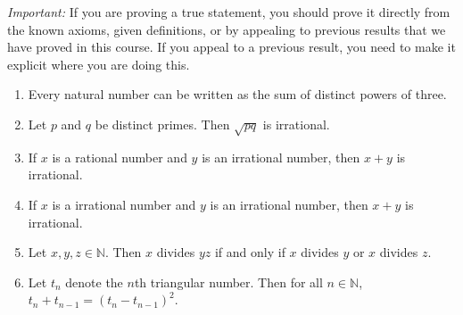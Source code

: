 \documentclass[11pt]{article}
\theoremstyle{definition}
\begin{document}
\bigskip

\emph{Important:}  If you are proving a true statement, you should prove it directly from the known axioms, given definitions, or by appealing to previous results that we have proved in this course.  If you appeal to a previous result, you need to make it explicit where you are doing this.

\begin{enumerate}

\item Every natural number can be written as the sum of distinct powers of three. 

\item Let $p$ and $q$ be distinct primes.  Then $\sqrt{pq}$ is irrational.

\item If $x$ is a rational number and $y$ is an irrational number, then $x+y$ is irrational.

\item If $x$ is a irrational number and $y$ is an irrational number, then $x+y$ is irrational.

\item Let $x,y,z\in \mathbb{N}$.  Then $x$ divides $yz$ if and only if $x$ divides $y$ or $x$ divides $z$.

\item Let $t_n$ denote the $n$th triangular number.  Then for all $n\in \mathbb{N}$, $t_n+t_{n-1}=(t_n-t_{n-1})^2$.

\end{enumerate}
\end{document}
